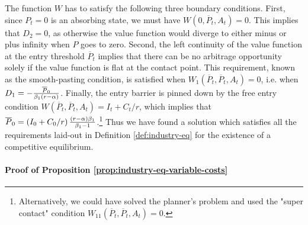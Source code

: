 \documentclass[12pt, a4paper]{article}
\begin{document}

The function $W$ has to satisfy the following three boundary conditions.
First, since $P_t=0$ is an absorbing state, we must have $W(0,%
\overline{P}_t,A_t)=0$. This implies that $D_2=0$, as otherwise the value
function would diverge to either minus or plus infinity when $P$ goes to
zero. Second, the left continuity of the value function at the entry
threshold $\overline{P}_t$ implies that there can be no arbitrage
opportunity solely if the value function is flat at the contact point. This
requirement, known as the smooth-pasting condition, is satisfied when $%
W_1\left(\overline{P}_t,\overline{P}_t,A_t\right)=0$, i.e. when $D_1=-\frac{%
\overline{P}_0}{\beta_1(r-\alpha)}$. Finally, the entry barrier is pinned
down by the free entry condition $W\left(\overline{P}_t,\overline{P}%
_t,A_t\right)=I_t+C_t/r$, %
which implies that $\overline{P}_0=\left(I_0+C_0/r\right)\frac{(r-\alpha)\beta_1}{%
\beta_1-1} $.\footnote{%
Alternatively, we could have solved the planner's problem and used the
"super contact" condition $W_{11}\left(\overline{P}_t,\overline{P}%
_t,A_t\right)=0$.} Thus we have found a solution which satisfies all the
requirements laid-out in Definition \ref{def:industry-eq} for the existence
of a competitive equilibrium.

\paragraph{Proof of Proposition \protect\ref{prop:industry-eq-variable-costs}%
}
\end{document}
